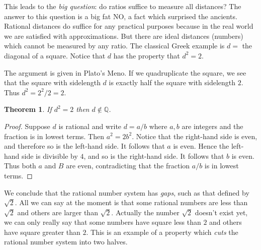 \documentclass[11pt,oneside]{amsbook}
\newcommand{\QQ}{\mathbb Q}
\theoremstyle{definition}
\theoremstyle{plain}
\newtheorem{thm}{Theorem}[section]
\theoremstyle{definition}
\theoremstyle{remark}
\numberwithin{equation}{section}
\numberwithin{figure}{section}
\begin{document}
This leads to the \emph{big question}: do ratios suffice to measure all distances? The answer to this question is a big fat NO, a fact which surprised the ancients. Rational distances do suffice for any practical purposes because in the real world we are satisfied with approximations. But there are ideal distances (numbers) which cannot be measured by any ratio. The classical Greek example is $d=$ the diagonal of a square. Notice that $d$ has the property that $d^2=2$.

\begin{center}
\quad
{}
\end{center}

The argument is given in Plato's Meno. If we quadruplicate the square, we see that the square with sidelength $d$ is exactly half the square with sidelength $2$. Thus $d^2=2^2/2=2$.

\begin{thm}
  \label{thm:root-2-irrational}
  If $d^2=2$ then $d\notin\QQ$.
\end{thm}

\begin{proof}
  Suppose $d$ is rational and write $d=a/b$ where $a,b$ are integers and the fraction is in lowest terms. Then $a^2=2b^2$. Notice that the right-hand side is even, and therefore so is the left-hand side. It follows that $a$ is even. Hence the left-hand side is divisible by $4$, and so is the right-hand side. It follows that $b$ is even. Thus both $a$ and $B$ are even, contradicting that the fraction $a/b$ is in lowest terms.
\end{proof}

We conclude that the rational number system has \emph{gaps}, such as that defined by $\sqrt2$. All we can say at the moment is that some rational numbers are less than $\sqrt2$ and others are larger than $\sqrt2$. Actually the number $\sqrt2$ doesn't exist yet, we can only really say that some numbers have square less than $2$ and others have square greater than $2$. This is an example of a property which \emph{cuts} the rational number system into two halves.
\end{document}
